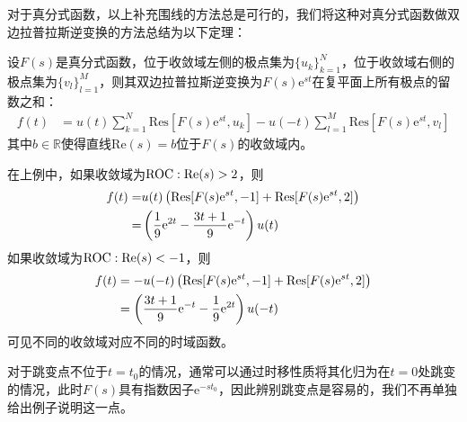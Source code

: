 对于真分式函数，以上补充围线的方法总是可行的，我们将这种对真分式函数做双边拉普拉斯逆变换的方法总结为以下定理：
\begin{theorem}
    设$F(s)$是真分式函数，位于收敛域左侧的极点集为$\{u_k\}_{k=1}^{N}$，位于收敛域右侧的极点集为$\{v_l\}_{l=1}^{M}$，则其双边拉普拉斯逆变换为$F(s)\mathrm{e}^{st}$在复平面上所有极点的留数之和：
    \begin{align*}
        f(t)&=u(t)\sum_{k=1}^{N}\mathrm{Res}[F(s)\mathrm{e}^{st},u_k]-u(-t)\sum_{l=1}^{M}\mathrm{Res}[F(s)\mathrm{e}^{st},v_l]
    \end{align*}
    其中$b\in\mathbb{R}$使得直线$\mathrm{Re}(s)=b$位于$F(s)$的收敛域内。
\end{theorem}

\begin{example}
    在上例中，如果收敛域为$\operatorname{ROC}: \mathrm{Re}(s)>2$，则
    \begin{align*}
        f(t)=&u(t)\left(\operatorname{Res}[F(s)\mathrm{e}^{st},-1]+\operatorname{Res}[F(s)\mathrm{e}^{st},2]\right)\\
        =&\left(\frac{1}{9}\mathrm{e}^{2t}-\frac{3t + 1}{9}\mathrm{e}^{-t}\right)u(t)
    \end{align*}
    如果收敛域为$\operatorname{ROC}: \mathrm{Re}(s)<-1$，则
    \begin{align*}
        f(t)&=-u(-t)\left(\operatorname{Res}[F(s)\mathrm{e}^{st},-1]+\operatorname{Res}[F(s)\mathrm{e}^{st},2]\right)\\
        &=\left(\frac{3t + 1}{9}\mathrm{e}^{-t}-\frac{1}{9}\mathrm{e}^{2t}\right)u(-t)
    \end{align*}
    可见不同的收敛域对应不同的时域函数。
\end{example}

对于跳变点不位于$t=t_0$的情况，通常可以通过时移性质将其化归为在$t=0$处跳变的情况，此时$F(s)$具有指数因子$\mathrm{e}^{-st_0}$，因此辨别跳变点是容易的，我们不再单独给出例子说明这一点。
